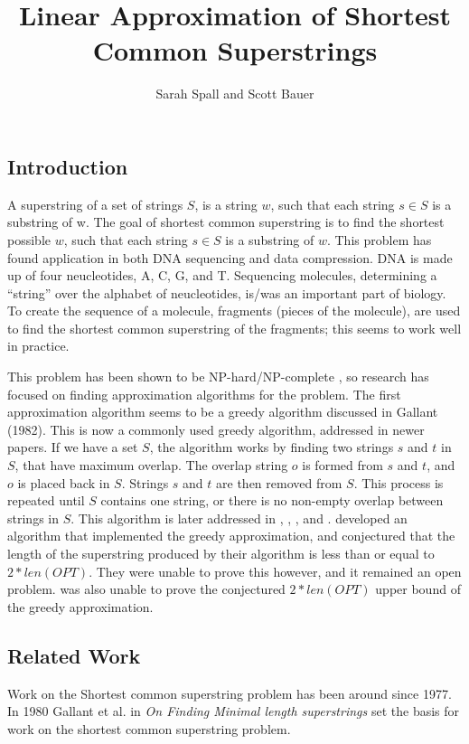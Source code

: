 \documentclass[letterpaper,11pt,titlepage]{article}
\title{Linear Approximation of Shortest Common Superstrings}
\author[1]{Sarah Spall and Scott Bauer}
\begin{document}
\maketitle
\newpage

\subsection*{Introduction}
A superstring of a set of strings $S$, is a string $w$, such that each string $s \in S$ is a substring
of w.  The goal of shortest common superstring is to find the shortest possible $w$, such that each 
string $s \in S$ is a substring of $w$. This problem has found application in both DNA sequencing 
and data compression.  DNA is made up of four neucleotides, A, C, G, and T.  Sequencing molecules,
determining a ``string'' over the alphabet of neucleotides, is/was an important part of biology.  To 
create the sequence of a molecule, fragments (pieces of the molecule), are used to find the shortest
common superstring of the fragments; this seems to work well in practice.  \cite{li1990towards}

 
This problem has been shown to be NP-hard/NP-complete \cite{blum1991linear} \cite{johngallant1980}, 
so research has focused on finding approximation algorithms for the problem.  The first approximation 
algorithm seems to be a greedy algorithm discussed in Gallant (1982). This is now a commonly used greedy 
algorithm, addressed in newer papers.  If we have a set $S$, the algorithm works by finding two strings $s$
and $t$ in $S$, that have maximum overlap.  The overlap string $o$ is formed from $s$ and $t$, and $o$ is
placed back in $S$.  Strings $s$ and $t$ are then removed from $S$.  This process is repeated until
$S$ contains one string, or there is no non-empty overlap between strings in $S$.  This algorithm is later
addressed in \cite{turner1989approximation}, \cite{tarhio1988greedy}, \cite{li1990towards}, and \cite{blum1991linear}.
\cite{tarhio1988greedy} developed an algorithm that implemented the greedy approximation, and conjectured that 
the length of the superstring produced by their algorithm is less than or equal to $2*len(OPT)$.  They were unable
to prove this however, and it remained an open problem.  \cite{turner1989approximation} was also unable to prove
the conjectured $2*len(OPT)$ upper bound of the greedy approximation.  


\subsection{Related Work}
Work on the Shortest common superstring problem has been around since 1977. In 1980 Gallant et al. in \textit{On Finding Minimal length superstrings}\cite{gallant1980finding} set the basis for work on the shortest common superstring problem. 
\end{document}
